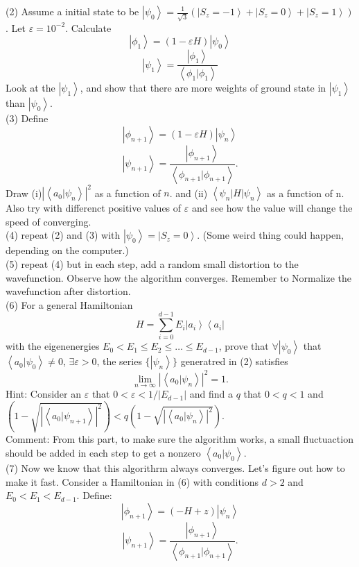 \documentclass[letter]{article}
\begin{document}
\indent (2) Assume a initial state to be $\left|\psi_0\right>=\frac{1}{\sqrt{3}}(\left|S_z=-1\right>+\left|S_z=0\right>+\left|S_z=1\right>)$. Let $\varepsilon=10^{-2}$. Calculate 
$$\left|\phi_1\right>=\left(1-\varepsilon H \right)\left|\psi_0\right>$$
$$\left|\psi_1\right>=\frac{\left|\phi_1\right>}{\left<\phi_1|\phi_1\right>}$$
Look at the $\left|\psi_1\right>$, and show that  there are more weights of ground state in $\left|\psi_1\right>$ than $\left|\psi_0\right>$.\\
\indent (3) Define 
$$\left|\phi_{n+1}\right>=\left(1-\varepsilon H\right) \left|\psi_n\right>$$
$$\left|\psi_{n+1}\right>=\frac{\left|\phi_{n+1}\right>}{\left<\phi_{n+1}|\phi_{n+1}\right>}.$$
Draw (i)$\left|\left<a_0|\psi_n\right>\right|^2$ as a function of $n$. and 
(ii) $\left<\psi_n|H|\psi_n\right>$ as a function of n. Also try with differenct positive values of $\varepsilon$ and see how the value will change the speed of converging.\\
\indent (4) repeat (2) and (3) with $\left|\psi_0\right>=\left|S_z=0\right>$. (Some weird thing could happen, depending on the computer.)\\ 
\indent (5) repeat (4) but in each step, add a random small distortion to the wavefunction. Observe how the algorithm converges. Remember to Normalize the wavefunction after distortion. \\ 
\indent (6) For a general Hamiltonian
$$ H = \sum_{i=0}^{d-1} E_{i} \left|a_i\right>\left<a_i\right|
$$
with the eigenenergies $E_0<E_1\leq E_2 \leq \ldots\leq E_{d-1}$, prove that $\forall \left|\psi_0\right> $ that $\left<a_0|\psi_0\right>\neq 0$, $\exists \varepsilon>0$, the series $\{\left| \psi_n\right>\}$ generatred in (2) satisfies $$
\lim_{n\rightarrow\infty} \left|\left<a_0|\psi_n\right>\right|^2=1.
$$
\indent Hint: Consider an $\varepsilon$ that $0<\varepsilon<1/|E_{d-1}|$ and find a $q$ that $0<q<1$ and $\left(1-\sqrt{\left|\left<a_0|\psi_{n+1}\right>\right|^2}\right)<q\left(1-\sqrt{\left|\left<a_0|\psi_{n}\right>\right|^2}\right)$.\\
\indent Comment: From this part, to make sure the algorithm works, a small fluctuaction should be added in each step to get a nonzero $\left<a_0|\psi_0\right>$.\\
\indent (7) Now we know that this algorithrm always converges. Let's figure out how to make it fast. Consider a Hamiltonian in (6) with conditions $d>2$ and $E_0<E_1<E_{d-1}$. Define:$$\left|\phi_{n+1}\right>=\left(-H+z\right) \left|\psi_n\right>$$
$$\left|\psi_{n+1}\right>=\frac{\left|\phi_{n+1}\right>}{\left<\phi_{n+1}|\phi_{n+1}\right>}.$$
\end{document}
